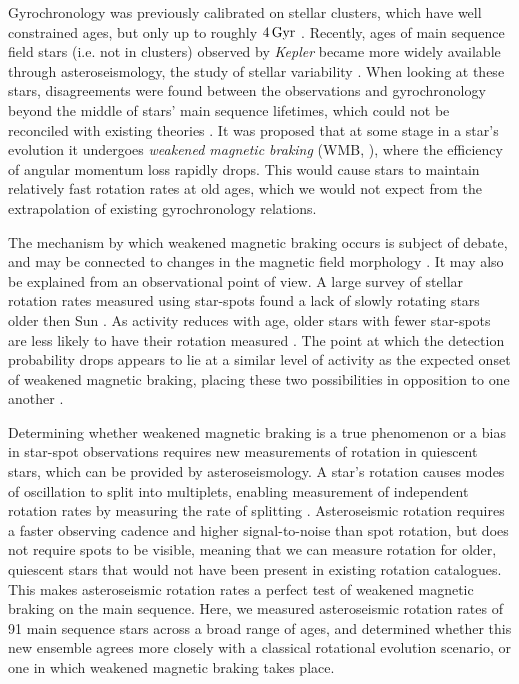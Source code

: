 \documentclass[12pt]{article}
\newcommand{\kepler}{\emph{Kepler}\xspace}
\begin{document}
Gyrochronology was previously calibrated on stellar clusters, which have well constrained ages, but only up to roughly $4\, \rm{Gyr}$ \cite{meibom+2015, barnes+2016}. Recently, ages of main sequence field stars (i.e. not in clusters) observed by \kepler \cite{borucki+2010} became more widely available through asteroseismology, the study of stellar variability \cite{silvaaguirre+2015}. When looking at these stars, disagreements were found between the observations and gyrochronology beyond the middle of stars' main sequence lifetimes, which could not be reconciled with existing theories \cite{angus+2015, nielsen+2015, davies+2015}. It was proposed that at some stage in a star's evolution it undergoes \textit{weakened magnetic braking} (WMB, \cite{vansaders+2016}), where the efficiency of angular momentum loss rapidly drops. This would cause stars to maintain relatively fast rotation rates at old ages, which we would not expect from the extrapolation of existing gyrochronology relations.

The mechanism by which weakened magnetic braking occurs is subject of debate, and may be connected to changes in the magnetic field morphology \cite{vansaders+2016,reville+2015,garraffo+2016, metcalfe+2016, metcalfe+2019, see+2019}. It may also be explained from an observational point of view. A large survey of stellar rotation rates measured using star-spots found a lack of slowly rotating stars older then Sun \cite{mcquillan+2014}. As activity reduces with age, older stars with fewer star-spots are less likely to have their rotation measured \cite{matt+2015, reinhold+2020}. The point at which the detection probability drops appears to lie at a similar level of activity as the expected onset of weakened magnetic braking, placing these two possibilities in opposition to one another \cite{vansaders+2019}.

Determining whether weakened magnetic braking is a true phenomenon or a bias in star-spot observations requires new measurements of rotation in quiescent stars, which can be provided by asteroseismology. A star's rotation causes modes of oscillation to split into multiplets, enabling measurement of independent rotation rates by measuring the rate of splitting \cite{ledoux1951}. Asteroseismic rotation requires a faster observing cadence and higher signal-to-noise than spot rotation, but does not require spots to be visible, meaning that we can measure rotation for older, quiescent stars that would not have been present in existing rotation catalogues. This makes asteroseismic rotation rates a perfect test of weakened magnetic braking on the main sequence. Here, we measured asteroseismic rotation rates of 91 main sequence stars across a broad range of  ages, and determined whether this new ensemble agrees more closely with a classical rotational evolution scenario, or one in which weakened magnetic braking takes place.\\
\end{document}
